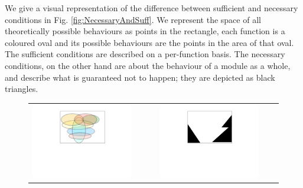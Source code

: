 We give a visual representation of the difference between sufficient and necessary conditions in 
Fig. \ref{fig:NecessaryAndSuff}. We
represent the space of all theoretically possible behaviours as points in the rectangle, 
each function is a coloured oval and its possible behaviours are the points in the area of that oval.  
The sufficient conditions are described on a per-function basis. 
The necessary conditions, on the other hand are about the behaviour of a module as a whole, 
and describe what is guaranteed not to happen;
they are depicted as black triangles. 

  \begin{figure}[htb]
 \begin{tabular}{ccccc}
\begin{minipage}{0.25\textwidth}
 \includegraphics[width=\linewidth, trim=250  320 260 60,clip]{diagrams/Suff.pdf}
\end{minipage}
 & \ \ \ & 
\begin{minipage}{0.25\textwidth}
 \includegraphics[width=\linewidth, trim=250  320 260 60,clip]{diagrams/Nec.pdf}

\end{minipage}
\end{tabular}
\end{figure}
